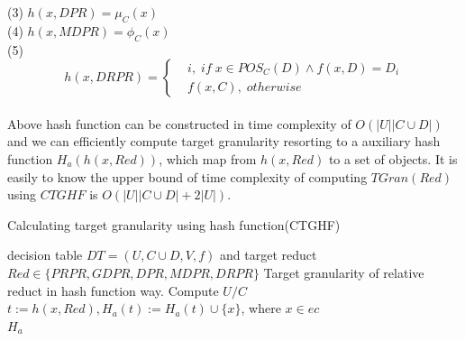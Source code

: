 \documentclass[review]{elsarticle}
\begin{document}
		{\rm(3)} $h(x,DPR)=\mu_C(x)$\\
		{\rm(4)} $h(x,MDPR)=\phi_C(x)$\\
		{\rm(5)} $$ h(x,DRPR)=\left \{ \begin{aligned}&i ,\; if \; x \in POS_C(D) \wedge f(x,D)=D_i\\ &f(x,C) ,\; otherwise \end{aligned} \right. $$\\
		Above hash function can be constructed in time complexity of $O(|U||C \cup D|)$ and we can efficiently compute target granularity resorting to a auxiliary hash function $H_a(h(x,Red))$, which map from $h(x,Red)$ to a set of objects. It is easily to know the upper bound of time complexity of computing $TGran(Red)$ using $CTGHF$ is $O(|U||C \cup D|+2|U|)$.
		\begin{algorithm}[htb]
			\caption{Calculating target granularity using hash function(CTGHF)}
			\label{CTGHF}
			\begin{algorithmic}[1]
				\Require decision table $DT=(U, C \cup D,V,f)$ and target reduct $Red \in \{PRPR,GDPR,DPR,MDPR,DRPR\}$
				\Ensure Target granularity of relative reduct in hash function way.
				\State Compute $U/C$
				\State $t:=h(x,Red), H_a(t):= H_a(t) \cup \{x\}$, where $x \in ec$
				\EndFor\\
				\Return $H_a$
			\end{algorithmic}
		\end{algorithm}
		
\end{document}
